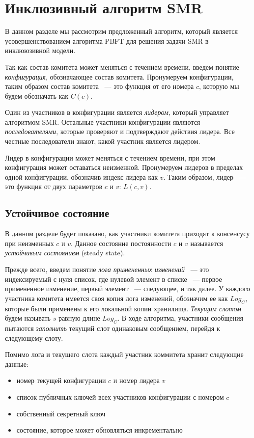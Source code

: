 \section{Инклюзивный алгоритм SMR}
В данном разделе мы рассмотрим предложенный алгоритм, 
который является усовершенствованием алгоритма PBFT\cite{pbft} для решения задачи SMR в инклююзивной модели.
 
Так как состав комитета может меняться с течением времени, введем понятие \textit{конфигурация}, обозначающее состав комитета. Пронумеруем конфигурации, таким образом состав комитета ~--- это функция от его номера $c$, которую мы будем обозначать как $C(c)$. 
 
Один из участников в конфигурации является \textit{лидером}, который управляет алгоритмом SMR. 
Остальные участники конфигурации являются \textit{последователями}, которые проверяют и подтверждают действия лидера. Все честные последователи знают, какой участник является лидером.

Лидер в конфигурации может меняться с течением времени, при этом конфигурация может оставаться неизменной. Пронумеруем лидеров в пределах одной конфигурации, обозначив индекс лидера как $v$. Таким образом, лидер ~--- это функция от двух параметров $c$ и $v$: $L(c, v)$.

\subsection{Устойчивое состояние} \label{steady-state}
В данном разделе будет показано, как участники комитета приходят к консенсусу при неизменных $c$ и $v$. Данное состояние постоянности $c$ и $v$ называется \textit{устойчивым состоянием} (steady state).

Прежде всего, введем понятие \textit{лога примененных изменений} ~--- это индексируемый с нуля список, где нулевой элемент в списке ~--- первое примененное изменение, первый элемент ~--- следующее, и так далее. У каждого участника комитета имеется своя копия лога изменений, обозначим ее как $Log_C$, которые были применены к его локальной копии хранилища. \textit{Текущим слотом} будем называть $s$ равную длине $Log_C$. 
В ходе алгоритма, участники сообщения пытаются \textit{заполнить} текущий слот одинаковым сообщением, перейдя к следующему слоту.

Помимо лога и текущего слота каждый участник коммитета хранит следующие данные:
\begin{itemize}
\item номер текущей конфигурации $c$ и номер лидера $v$
\item список публичных ключей всех участников конфигурации с номером $c$ 
\item собственный секретный ключ
\item состояние, которое может обновляться инкрементально
\end{itemize}

